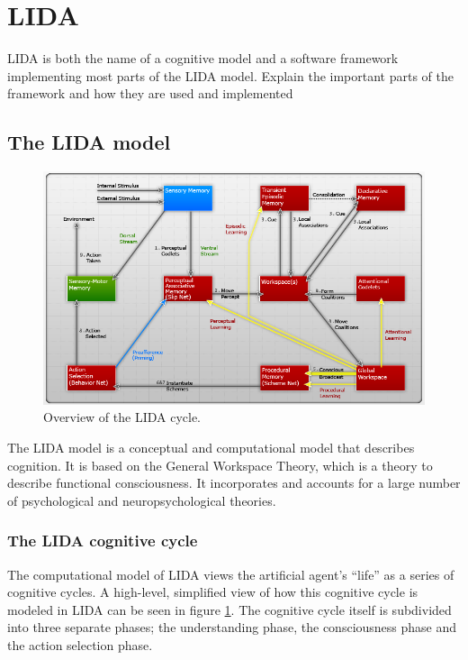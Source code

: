 \section{LIDA}
\label{sec:lida}
LIDA is both the name of a cognitive model and a software framework implementing
most parts of the LIDA model.
Explain the important parts of the framework and how they are used and implemented

\subsection{The LIDA model}
\begin{figure}[h!tb]
\centering
\includegraphics[width=0.75\textheight]{graphics/lida-model.png}
\caption{Overview of the LIDA cycle.\cite{franklin2007lida}}
\label{fig:lida-cycle}
\end{figure}
The LIDA model is a conceptual and computational model that describes cognition.
It is based on the General Workspace Theory, which is a theory to describe
functional consciousness. It incorporates and accounts for a large number of
psychological and neuropsychological theories.

\subsubsection{The LIDA cognitive cycle}
The computational model of LIDA views the artificial agent's ``life'' as a
series of cognitive cycles. A high-level, simplified view of how this cognitive
cycle is modeled in LIDA can be seen in figure \ref{fig:lida-cycle}.
The cognitive cycle itself is subdivided into three separate phases; the
understanding phase, the consciousness phase and the action selection phase.
